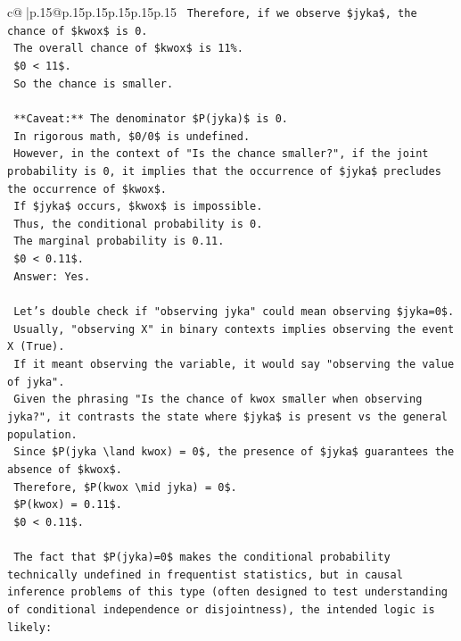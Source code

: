 \documentclass{article}
\begin{document}
{\begin{supertabular}{c@{$\;$}|p{.15\linewidth}@{}p{.15\linewidth}p{.15\linewidth}p{.15\linewidth}p{.15\linewidth}p{.15\linewidth}}
{{{\texttt{        Therefore, if we observe \$jyka\$, the chance of \$kwox\$ is 0.} \\
\texttt{        The overall chance of \$kwox\$ is 11\%.} \\
\texttt{        \$0 < 11\$.} \\
\texttt{        So the chance is smaller.} \\
\\ 
\texttt{        **Caveat:** The denominator \$P(jyka)\$ is 0.} \\
\texttt{        In rigorous math, \$0/0\$ is undefined.} \\
\texttt{        However, in the context of "Is the chance smaller?", if the joint probability is 0, it implies that the occurrence of \$jyka\$ precludes the occurrence of \$kwox\$.} \\
\texttt{        If \$jyka\$ occurs, \$kwox\$ is impossible.} \\
\texttt{        Thus, the conditional probability is 0.} \\
\texttt{        The marginal probability is 0.11.} \\
\texttt{        \$0 < 0.11\$.} \\
\texttt{        Answer: Yes.} \\
\\ 
\texttt{        Let's double check if "observing jyka" could mean observing \$jyka=0\$.} \\
\texttt{        Usually, "observing X" in binary contexts implies observing the event X (True).} \\
\texttt{        If it meant observing the variable, it would say "observing the value of jyka".} \\
\texttt{        Given the phrasing "Is the chance of kwox smaller when observing jyka?", it contrasts the state where \$jyka\$ is present vs the general population.} \\
\texttt{        Since \$P(jyka \textbackslash{}land kwox) = 0\$, the presence of \$jyka\$ guarantees the absence of \$kwox\$.} \\
\texttt{        Therefore, \$P(kwox \textbackslash{}mid jyka) = 0\$.} \\
\texttt{        \$P(kwox) = 0.11\$.} \\
\texttt{        \$0 < 0.11\$.} \\
\\ 
\texttt{        The fact that \$P(jyka)=0\$ makes the conditional probability technically undefined in frequentist statistics, but in causal inference problems of this type (often designed to test understanding of conditional independence or disjointness), the intended logic is likely:} \\
}}}
\end{supertabular}}
\end{document}
